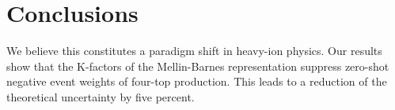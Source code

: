 \section{Conclusions}\label{sec:conclusions}

We believe this constitutes a paradigm shift in heavy-ion physics. Our
results show that the K-factors of the Mellin-Barnes representation
suppress zero-shot negative event weights of four-top production. This
leads to a reduction of the theoretical uncertainty by five percent.

